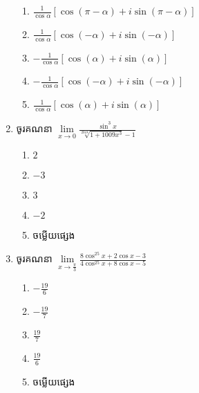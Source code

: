\documentclass[12pt, a4paper]{article}
\begin{document}
\begin{enumerate}[m]
	\begin{enumerate}[k,2]
		\item $\frac{1}{\cos\alpha}\left[ \cos\left(\pi-\alpha\right)+i\sin\left(\pi-\alpha\right) \right]$
		\item $\frac{1}{\cos\alpha}\left[ \cos\left(-\alpha\right)+i\sin\left(-\alpha\right)\right]$
		\item $-\frac{1}{\cos\alpha}\left[ \cos\left(\alpha\right)+i\sin\left(\alpha\right)\right]$
		\item $-\frac{1}{\cos\alpha}\left[ \cos\left(-\alpha\right)+i\sin\left(-\alpha\right)\right]$
		\item $\frac{1}{\cos\alpha}\left[ \cos\left(\alpha\right)+i\sin\left(\alpha\right) \right]$
	\end{enumerate}
	{\color{blue}\hrulefill}
	\item ចូរគណនា $\lim\limits_{x\to0}\frac{\sin^3x}{\sqrt[2018]{1+1009x^3}-1}$
	\begin{enumerate}[k,5]
		\item $2$
		\item $-3$
		\item $3$
		\item $-2$
		\item ចម្លើយផ្សេង
	\end{enumerate}
	{\color{blue}\hrulefill}
	\item ចូរគណនា $\lim\limits_{x\to\frac{\pi}{3}}\frac{8\cos^25x+2\cos x-3}{4\cos^25x+8\cos x-5}$
	\begin{enumerate}[k,5]
		\item $-\frac{19}{6}$
		\item $-\frac{19}{7}$
		\item $\frac{19}{7}$
		\item $\frac{19}{6}$
		\item ចម្លើយផ្សេង
	\end{enumerate}
	{\color{blue}\hrulefill}
\end{enumerate}
\makeads
\newpage
\maketitle
{\color{blue}\hrulefill}
\end{document}
